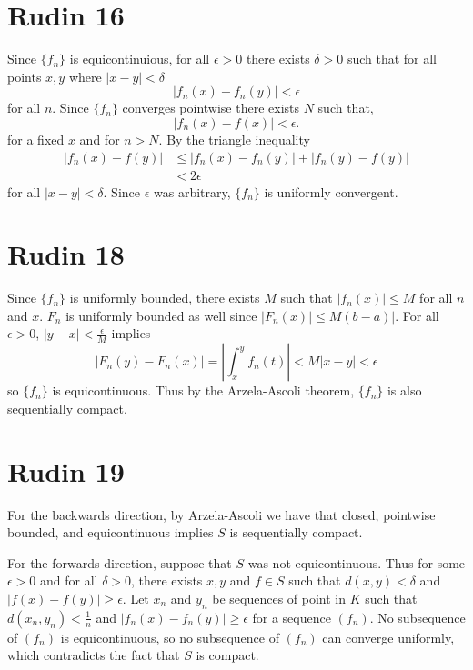 \documentclass{article}
\begin{document}
\section*{Rudin 16}
Since $\{f_n\}$ is equicontinuious,
for all $\epsilon > 0$ there exists $\delta > 0$ such that
for all points $x, y$ where $|x-y| < \delta$ 
\[
	|f_n(x) - f_n(y)| < \epsilon
\]
for all $n$.
Since $\{f_n\}$ converges pointwise there exists $N$ such that,
\[
	|f_n(x) - f(x)| < \epsilon.
\]
for a fixed $x$ and for $n > N$.
By the triangle inequality 
\begin{align*}
	|f_n(x) - f(y)| &\leq |f_n(x) - f_n(y)| + |f_n(y) - f(y)| \\
	&< 2\epsilon
\end{align*}
for all $|x-y| < \delta$.
Since $\epsilon$ was arbitrary, $\{f_n\}$ is uniformly convergent.
\newpage 

\section*{Rudin 18}
Since $\{f_n\}$ is uniformly bounded, there exists $M$ such that $|f_n(x)| \leq M$
for all $n$ and $x$.
$F_n$ is uniformly bounded as well since $|F_n(x)| \leq M(b-a)|$.
For all $\epsilon > 0$, $|y-x| < \frac{\epsilon}{M}$ implies 
\[
	|F_n(y) - F_n(x)| = \left|\int_x^y f_n(t)\right| < M|x-y| <\epsilon
\]
so $\{f_n\}$ is equicontinuous.
Thus by the Arzela-Ascoli theorem, $\{f_n\}$ is also sequentially compact.
\newpage 

\section*{Rudin 19}
For the backwards direction, by Arzela-Ascoli we have that 
closed, pointwise bounded, and equicontinuous implies 
$S$ is sequentially compact.

For the forwards direction, suppose that $S$ was not equicontinuous.
Thus for some $\epsilon > 0$ and for all $\delta > 0$,
there exists $x, y$ and $f \in S$ such that $d(x,y) < \delta$
and $|f(x) - f(y)| \geq \epsilon$.
Let $x_n$ and $y_n$ be sequences of point in $K$
such that $d(x_n, y_n) < \frac{1}{n}$ and $|f_n(x) - f_n(y)| \geq \epsilon$
for a sequence $(f_n)$.
No subsequence of $(f_n)$ is equicontinuous,
so no subsequence of $(f_n)$ can converge uniformly,
which contradicts the fact that $S$ is compact.




\newpage




\end{document}
